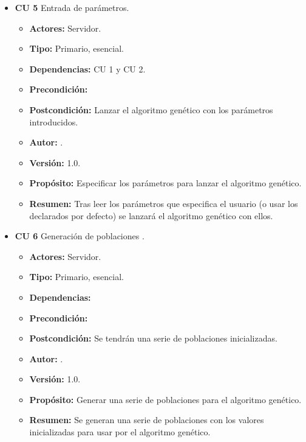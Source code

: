 \begin{itemize}
	\item \textbf{CU 5} Entrada de parámetros.
	\begin{itemize}
		\item \textbf{Actores:} Servidor.
		\item \textbf{Tipo:} Primario, esencial.
		\item \textbf{Dependencias:} CU 1 y CU 2.
		\item \textbf{Precondición:} 
		\item \textbf{Postcondición:} Lanzar el algoritmo genético con los parámetros introducidos.
		\item\textbf{ Autor:} {\autor}.
		\item \textbf{Versión:} 1.0.
		\item \textbf{Propósito:} Especificar los parámetros para lanzar el algoritmo genético.
		\item \textbf{Resumen:} Tras leer los parámetros que especifica el usuario (o usar los declarados por defecto) se lanzará el algoritmo genético con ellos.
	\end{itemize}	

	\item \textbf{CU 6} Generación de poblaciones .
	\begin{itemize}
		\item \textbf{Actores:} Servidor.
		\item \textbf{Tipo:} Primario, esencial.
		\item \textbf{Dependencias:} 
		\item \textbf{Precondición:}
		\item \textbf{Postcondición:} Se tendrán una serie de poblaciones inicializadas.
		\item\textbf{ Autor:} {\autor}.
		\item \textbf{Versión:} 1.0.
		\item \textbf{Propósito:} Generar una serie de poblaciones para el algoritmo genético.
		\item \textbf{Resumen:} Se generan una serie de poblaciones con los valores inicializadas para usar por el algoritmo genético.
	\end{itemize}	


\end{itemize}
